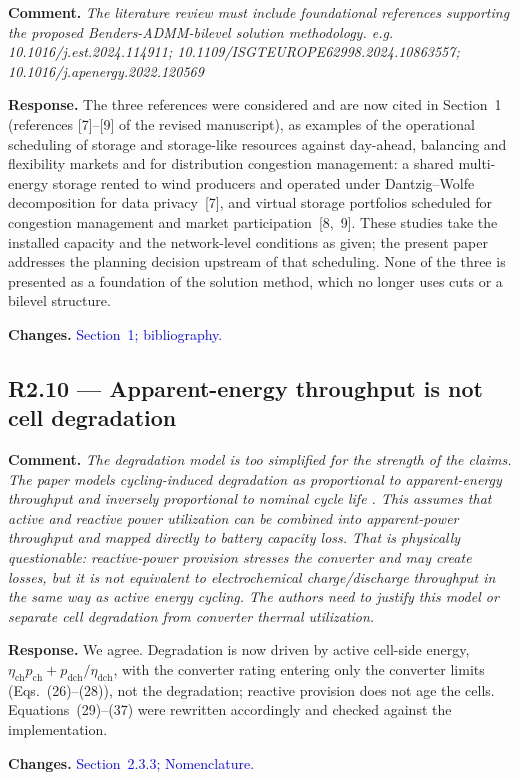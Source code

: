 \documentclass[11pt]{article}
\newcommand{\rcomment}[1]{\par\medskip\noindent\textbf{Comment.} \textit{#1}\par\smallskip}
\newcommand{\rresponse}[1]{\noindent\textbf{Response.} #1\par\smallskip}
\newcommand{\rchanges}[1]{\noindent\textbf{Changes.} \textcolor{blue}{#1}\par\medskip}
\begin{document}
\rcomment{
    The literature review must include foundational references supporting the proposed Benders-ADMM-bilevel solution methodology. e.g. 10.1016/j.est.2024.114911; 10.1109/ISGTEUROPE62998.2024.10863557; 10.1016/j.apenergy.2022.120569
}

\rresponse{
    The three references were considered and are now cited in Section~1 (references [7]--[9] of the revised manuscript), as examples of the operational scheduling of storage and storage-like resources against day-ahead, balancing and flexibility markets and for distribution congestion management: a shared multi-energy storage rented to wind producers and operated under Dantzig--Wolfe decomposition for data privacy~[7], and virtual storage portfolios scheduled for congestion management and market participation~[8,~9]. These studies take the installed capacity and the network-level conditions as given; the present paper addresses the planning decision upstream of that scheduling. None of the three is presented as a foundation of the solution method, which no longer uses cuts or a bilevel structure.
}

\rchanges{Section~1; bibliography.}

\subsection*{R2.10 --- Apparent-energy throughput is not cell degradation}
\rcomment{
The degradation model is too simplified for the strength of the claims. The paper models cycling-induced degradation as proportional to apparent-energy throughput and inversely proportional to nominal cycle life . This assumes that active and reactive power utilization can be combined into apparent-power throughput and mapped directly to battery capacity loss. That is physically questionable: reactive-power provision stresses the converter and may create losses, but it is not equivalent to electrochemical charge/discharge throughput in the same way as active energy cycling. The authors need to justify this model or separate cell degradation from converter thermal utilization.
}
\rresponse{We agree. Degradation is now driven by active cell-side energy,
$\eta_{\mathrm{ch}} p_{\mathrm{ch}} + p_{\mathrm{dch}}/\eta_{\mathrm{dch}}$, with the converter rating
entering only the converter limits (Eqs.~(26)--(28)), not the degradation; reactive provision does not age the cells.
Equations~(29)--(37) were rewritten accordingly and checked against the implementation.}
\rchanges{Section~2.3.3; Nomenclature.}
\end{document}
